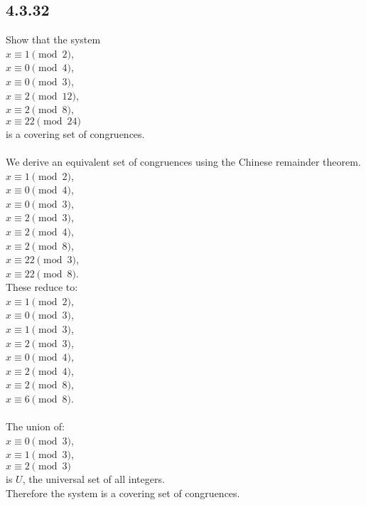 \documentclass{article}
\begin{document}
\subsection{4.3.32}
Show that the system 
\\$x\equiv1\pmod{2}$,
\\$x\equiv0\pmod{4}$,
\\$x\equiv0\pmod{3}$,
\\$x\equiv2\pmod{12}$,
\\$x\equiv2\pmod{8}$,
\\$x\equiv22\pmod{24}$
\\is a covering set of congruences.
\\
\\We derive an equivalent set of congruences
using the Chinese remainder theorem.
\\$x\equiv1\pmod{2}$,
\\$x\equiv0\pmod{4}$,
\\$x\equiv0\pmod{3}$,
\\$x\equiv2\pmod{3}$,
\\$x\equiv2\pmod{4}$,
\\$x\equiv2\pmod{8}$,
\\$x\equiv22\pmod{3}$,
\\$x\equiv22\pmod{8}$.
\\These reduce to:
\\$x\equiv1\pmod{2}$,
\\$x\equiv0\pmod{3}$,
\\$x\equiv1\pmod{3}$,
\\$x\equiv2\pmod{3}$,
\\$x\equiv0\pmod{4}$,
\\$x\equiv2\pmod{4}$,
\\$x\equiv2\pmod{8}$,
\\$x\equiv6\pmod{8}$.
\\
\\The union of:
\\$x\equiv0\pmod{3}$,
\\$x\equiv1\pmod{3}$,
\\$x\equiv2\pmod{3}$
\\is $U$, the universal set of all integers.
\\Therefore the system is a covering set of congruences.
\\

\newpage
\end{document}
